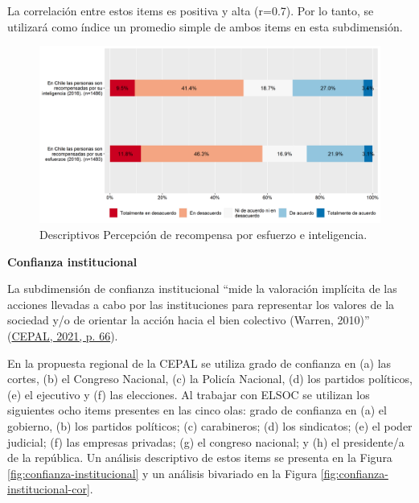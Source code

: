 \documentclass[
  12pt,
]{book}
\begin{document}
La correlación entre estos items es positiva y alta (r=0.7). Por lo tanto, se utilizará como índice un promedio simple de ambos items en esta subdimensión.

\begin{figure}[H]

{\centering \includegraphics[width=1\linewidth,height=1\textheight]{output/graphs/justicia} 

}

\caption{Descriptivos Percepción de recompensa por esfuerzo e inteligencia.}\label{fig:justicia}
\end{figure}

\textbf{Confianza institucional}

La subdimensión de confianza institucional ``mide la valoración implícita de las acciones llevadas a cabo por las instituciones para representar los valores de la sociedad y/o de orientar la acción hacia el bien colectivo (Warren, 2010)'' (\protect\hyperlink{ref-cepal_cohesion_2021}{CEPAL, 2021, p. 66}).

En la propuesta regional de la CEPAL se utiliza grado de confianza en (a) las cortes, (b) el Congreso Nacional, (c) la Policía Nacional, (d) los partidos políticos, (e) el ejecutivo y (f) las elecciones. Al trabajar con ELSOC se utilizan los siguientes ocho items presentes en las cinco olas: grado de confianza en (a) el gobierno, (b) los partidos políticos; (c) carabineros; (d) los sindicatos; (e) el poder judicial; (f) las empresas privadas; (g) el congreso nacional; y (h) el presidente/a de la república. Un análisis descriptivo de estos items se presenta en la Figura \ref{fig:confianza-institucional} y un análisis bivariado en la Figura \ref{fig:confianza-institucional-cor}.
\end{document}
